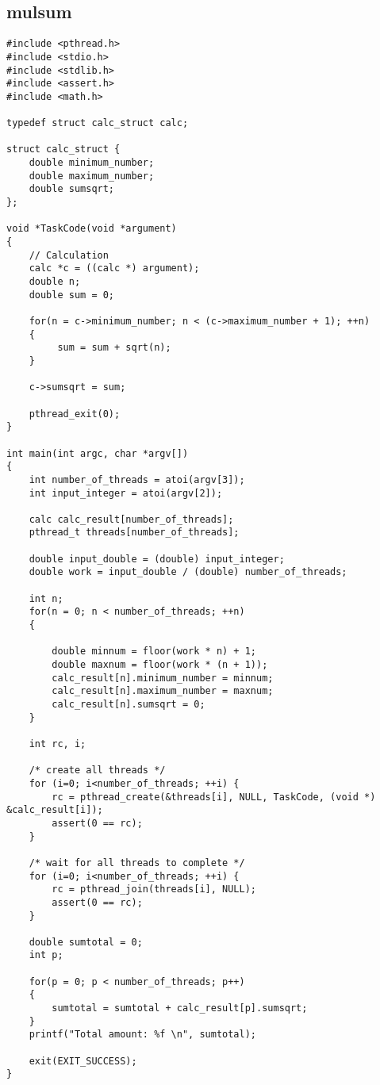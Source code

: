 \subsection{mulsum}
\begin{lstlisting}
#include <pthread.h>
#include <stdio.h>
#include <stdlib.h>
#include <assert.h>
#include <math.h>

typedef struct calc_struct calc;

struct calc_struct {
	double minimum_number;
	double maximum_number;
	double sumsqrt;
};

void *TaskCode(void *argument)
{
	// Calculation
	calc *c = ((calc *) argument);
	double n;
	double sum = 0;
	
	for(n = c->minimum_number; n < (c->maximum_number + 1); ++n)
	{
		 sum = sum + sqrt(n);
	}
	
	c->sumsqrt = sum;
	
	pthread_exit(0);
}

int main(int argc, char *argv[])
{
	int number_of_threads = atoi(argv[3]);
	int input_integer = atoi(argv[2]);

	calc calc_result[number_of_threads];
	pthread_t threads[number_of_threads];

	double input_double = (double) input_integer;
	double work = input_double / (double) number_of_threads;	

	int n;
	for(n = 0; n < number_of_threads; ++n)
	{
		
		double minnum = floor(work * n) + 1;
		double maxnum = floor(work * (n + 1));
		calc_result[n].minimum_number = minnum;
		calc_result[n].maximum_number = maxnum;
		calc_result[n].sumsqrt = 0;	
	}

	int rc, i;

	/* create all threads */
	for (i=0; i<number_of_threads; ++i) {
		rc = pthread_create(&threads[i], NULL, TaskCode, (void *) &calc_result[i]);
		assert(0 == rc);
	}
	
	/* wait for all threads to complete */
	for (i=0; i<number_of_threads; ++i) {
		rc = pthread_join(threads[i], NULL);
		assert(0 == rc);
	}

	double sumtotal = 0;
	int p;

	for(p = 0; p < number_of_threads; p++)
	{
		sumtotal = sumtotal + calc_result[p].sumsqrt;
	}
	printf("Total amount: %f \n", sumtotal);
	
	exit(EXIT_SUCCESS);
}

\end{lstlisting}